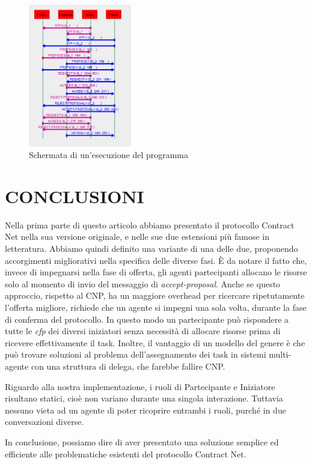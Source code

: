\documentclass[a4paper, 10pt, conference]{ieeeconf} %
\begin{document}
\begin{figure}[t]
\centering
\includegraphics[width=0.4\textwidth]{sniffer.png}
\caption{Schermata di un'esecuzione del programma} \label{f5}
\end{figure}

\section{CONCLUSIONI} \label{s3}
Nella prima parte di questo articolo abbiamo presentato il protocollo Contract Net nella sua versione originale, e nelle sue due estensioni più famose in letteratura. Abbiamo quindi definito una variante di una delle due, proponendo accorgimenti migliorativi nella specifica delle diverse fasi. \`{E} da notare il fatto che, invece di impegnarsi nella fase di offerta, gli agenti partecipanti allocano le risorse solo al momento di invio del messaggio di \emph{accept-proposal}. Anche se questo approccio, rispetto al CNP, ha un maggiore overhead per ricercare ripetutamente l'offerta migliore, richiede che un agente si impegni una sola volta, durante la fase di conferma del protocollo. In questo modo un partecipante può rispondere a tutte le \emph{cfp} dei diversi iniziatori senza necessità di allocare risorse prima di ricevere effettivamente il task. Inoltre, il vantaggio di un modello del genere è che può trovare soluzioni al problema dell'assegnamento dei task in sistemi multi-agente con una struttura di delega, che farebbe fallire CNP.

Riguardo alla nostra implementazione, i ruoli di Partecipante e Iniziatore risultano statici, cioè non variano durante una singola interazione. Tuttavia nessuno vieta ad un agente di poter ricoprire entrambi i ruoli, purché in due conversazioni diverse.

In conclusione, possiamo dire di aver presentato una soluzione semplice ed efficiente alle problematiche esistenti del protocollo Contract Net.
\end{document}
